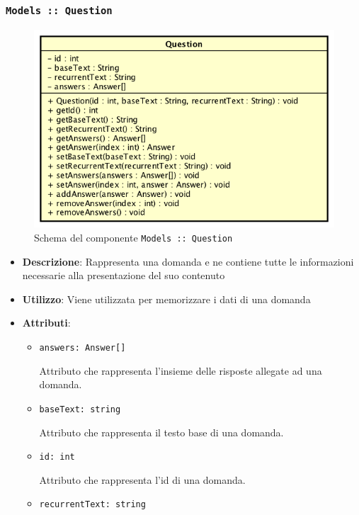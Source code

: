 \documentclass[../DefinizioneDiProdotto.tex]{subfiles}
\begin{document}
\begin{itemize}
	\newpage
	\subsubsection{\texttt{Models :: Question}}
	\begin{figure}[!h]
		\centering
		\includegraphics[scale=0.7]{Architettura/Models/Question.png}
		\caption{Schema del componente \texttt{Models :: Question}}
	\end{figure}
	\begin{itemize}\item \textbf{Descrizione}: Rappresenta una domanda e ne contiene tutte le informazioni necessarie alla presentazione del suo contenuto
	\item \textbf{Utilizzo}: Viene utilizzata per memorizzare i dati di una domanda
	\item \textbf{Attributi}:
	\begin{itemize}
	\item \texttt{answers: Answer[]}\

	 Attributo che rappresenta l'insieme delle risposte allegate ad una domanda.
	\end{itemize}
	\begin{itemize}
	\item \texttt{baseText: string}\

	 Attributo che rappresenta il testo base di una domanda.
	\end{itemize}
	\begin{itemize}
	\item \texttt{id: int}\

	 Attributo che rappresenta l'id di una domanda.
	\end{itemize}
	\begin{itemize}
	\item \texttt{recurrentText: string}\


\end{itemize}
\end{itemize}
\end{itemize}
\end{document}
